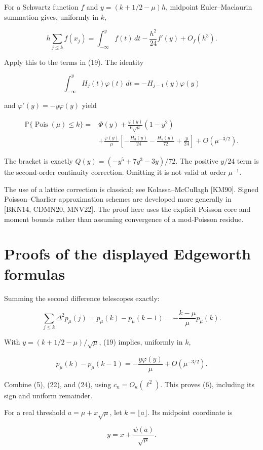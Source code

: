 \documentclass[
  11pt,
]{article}
\begin{document}
For a Schwartz function \(f\) and \(y=(k+1/2-\mu)h\), midpoint
Euler--Maclaurin summation gives, uniformly in \(k\),

\[
h\sum_{j\le k}f(x_j)
=\int_{-\infty}^{y}f(t)\,dt-\frac{h^2}{24}f'(y)+O_f(h^3).
\tag{21}
\]

Apply this to the terms in (19). The identity

\[
\int_{-\infty}^{y}H_j(t)\varphi(t)\,dt
=-H_{j-1}(y)\varphi(y)
\]

and \(\varphi'(y)=-y\varphi(y)\) yield

\[
\begin{split}
\mathbb P\{\operatorname{Pois}(\mu)\le k\}
={}&\Phi(y)+\frac{\varphi(y)}{6\sqrt\mu}(1-y^2)\\
&+\frac{\varphi(y)}\mu
\left[-\frac{H_3(y)}{24}-\frac{H_5(y)}{72}+\frac y{24}\right]
+O(\mu^{-3/2}).
\end{split}
\tag{22}
\]

The bracket is exactly \(Q(y)=(-y^5+7y^3-3y)/72\). The positive \(y/24\)
term is the second-order continuity correction. Omitting it is not valid
at order \(\mu^{-1}\).

The use of a lattice correction is classical; see Kolassa--McCullagh
{[}KM90{]}. Signed Poisson--Charlier approximation schemes are developed
more generally in {[}BKN14, CDMN20, MNV22{]}. The proof here uses the
explicit Poisson core and moment bounds rather than assuming convergence
of a mod-Poisson residue.

\section{Proofs of the displayed Edgeworth
formulas}\label{proofs-of-the-displayed-edgeworth-formulas}

Summing the second difference telescopes exactly:

\[
\sum_{j\le k}\Delta^2p_\mu(j)
=p_\mu(k)-p_\mu(k-1)
=-\frac{k-\mu}{\mu}p_\mu(k).
\tag{23}
\]

With \(y=(k+1/2-\mu)/\sqrt\mu\), (19) implies, uniformly in \(k\),

\[
p_\mu(k)-p_\mu(k-1)
=-\frac{y\varphi(y)}\mu+O(\mu^{-3/2}).
\tag{24}
\]

Combine (5), (22), and (24), using \(c_n=O_\kappa(\ell^2)\). This proves
(6), including its sign and uniform remainder.

For a real threshold \(a=\mu+x\sqrt\mu\), let \(k=\lfloor a\rfloor\).
Its midpoint coordinate is

\[
y=x+\frac{\psi(a)}{\sqrt\mu}.
\]
\end{document}
